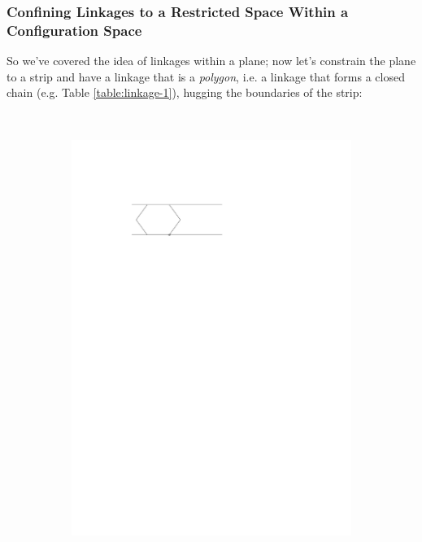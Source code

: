 \subsubsection{Confining Linkages to a Restricted Space Within a Configuration Space}
So we've covered the idea of linkages within a plane; now let's constrain the plane to a strip and have a linkage that is a \textit{polygon}, i.e. a linkage that forms a closed chain (e.g. Table \ref{table:linkage-1}), hugging the boundaries of the strip:
\begin{figure}[!ht]
\begin{center}
  ~ %
  \begin{subfigure}[b]{0.49\textwidth}
	  \includegraphics[width=\textwidth]{graphics/hexagonInChannelWithPinnedJointRight.pdf}

\end{subfigure}
\end{center}
\end{figure}
